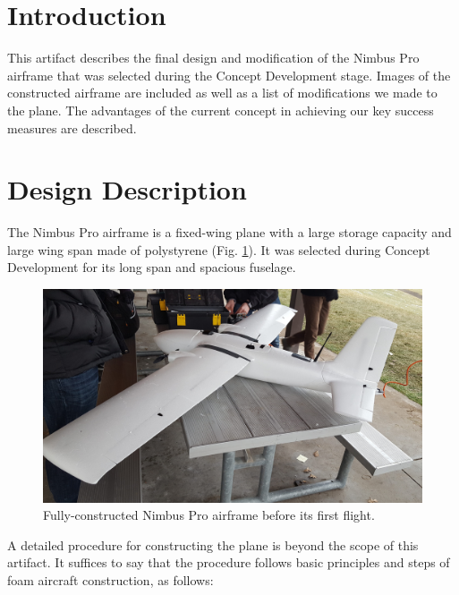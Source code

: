 \documentclass[]{auvsi_doc}
\begin{document}
\begin{AUVSITitlePage}
\begin{artifacttable}
\end{artifacttable}
\end{AUVSITitlePage}

\section{Introduction}
This artifact describes the final design and modification of the Nimbus Pro airframe that was selected during the Concept Development stage. Images of the constructed airframe are included as well as a list of modifications we made to the plane. The advantages of the current concept in achieving our key success measures are described.

\section{Design Description}
The Nimbus Pro airframe is a fixed-wing plane with a large storage capacity and large wing span made of polystyrene (Fig. \ref{fig:plane1}). It was selected during Concept Development for its long span and spacious fuselage.

\begin{figure}[h!]
	\centering
	\includegraphics[width=.9\columnwidth]{figs/plane1}
	\caption{Fully-constructed Nimbus Pro airframe before its first flight.}
	\label{fig:plane1}
\end{figure} 

A detailed procedure for constructing the plane is beyond the scope of this artifact. It suffices to say that the procedure follows basic principles and steps of foam aircraft construction, as follows:
\end{document}
